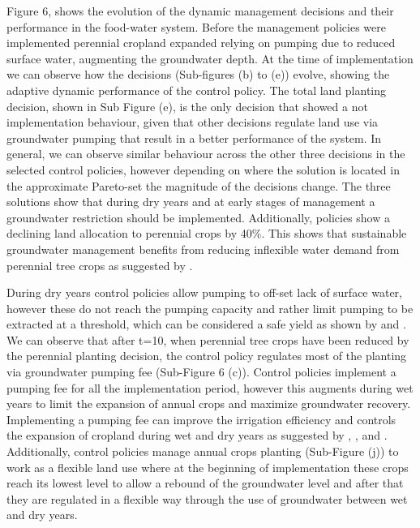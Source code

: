 \documentclass[11pt,a4paper]{article}
\begin{document}
Figure 6, shows the evolution of the dynamic management decisions and their performance in the food-water system. Before the management policies were implemented perennial cropland expanded relying on pumping due to reduced surface water, augmenting the groundwater depth. At the time of implementation we can observe how the decisions (Sub-figures (b) to (e)) evolve, showing the adaptive dynamic performance of the control policy. The total land planting decision, shown in Sub Figure (e), is the only decision that showed a not implementation behaviour, given that other decisions regulate land use via groundwater pumping that result in a better performance of the system. In general, we can observe similar behaviour across the other three decisions in the selected control policies, however depending on where the solution is located in the approximate Pareto-set the magnitude of the decisions change. The three solutions show that during dry years and at early stages of management a groundwater restriction should be implemented. Additionally, policies show a declining land allocation to perennial crops by 40\%. This shows that sustainable groundwater management benefits from reducing inflexible water demand from perennial tree crops as suggested by \textcite{qin_flexibility_2019}. 

During dry years control policies allow pumping to off-set lack of surface water, however these do not reach the pumping capacity and rather limit pumping to be extracted at a threshold, which can be considered a safe yield as shown by \textcite{miro_framework_2019} and \cite{macewan_hydroeconomic_2017}. We can observe that after t=10, when perennial tree crops have been reduced by the perennial planting decision, the control policy regulates most of the planting via groundwater pumping fee (Sub-Figure 6 (c)). Control policies implement a pumping fee for all the implementation period, however this augments during wet years to limit the expansion of annual crops and maximize groundwater recovery. Implementing a pumping fee can improve the irrigation efficiency and controls the expansion of cropland during wet and dry years as suggested by \textcite{stone_economic_2022}, \textcite{graveline_combining_2019}, and \textcite{khan_effect_2019}. Additionally, control policies manage annual crops planting (Sub-Figure (j)) to work as a flexible land use where at the beginning of implementation these crops reach its lowest level to allow a rebound of the groundwater level and after that they are regulated in a flexible way through the use of groundwater between wet and dry years. 
\end{document}
